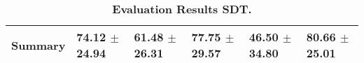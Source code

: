 \begin{table}[htb]
{\begin{tabular}{llllll}
\midrule
\textbf{Summary                                  } &                  \phantom{0}74.12 $\pm$ 24.94 &                      \phantom{0}61.48 $\pm$ 26.31 &                  \phantom{0}77.75 $\pm$ 29.57 &                  \phantom{0}46.50 $\pm$ 34.80 &            \phantom{0}80.66 $\pm$ 25.01 \\
\bottomrule
\end{tabular}%
}
\caption{\textbf{Evaluation Results SDT.}}
\label{tab:eval-results}
\end{table}


